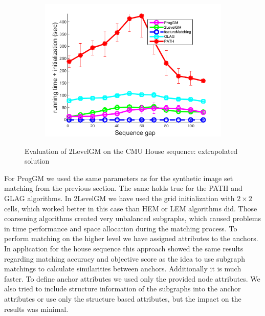 \begin{figure}[h]
\begin{subfigure}[b]{0.32\textwidth}
			\includegraphics[scale=0.25]{"chapter3/fig/HouseSeq2/anchor_descr/using_cpd_afftrafo/ext_solution2/performance/time_summary"}
		\end{subfigure} 	
	\caption[Evaluation of 2LevelGM on the CMU House sequence]{Evaluation of 2LevelGM on the CMU House sequence: extrapolated solution} \label{fig:House_ext_sol}
\end{figure}

For ProgGM we used the same parameters as for the synthetic image set matching from the previous section. The same holds true for the PATH and GLAG algorithms.
In 2LevelGM we have used the grid initialization with $2\times 2$ cells, which worked better in this case than HEM or LEM algorithms did. Those coarsening algorithms created very unbalanced subgraphs, which caused problems in time performance and space allocation during the matching process. To perform matching on the higher level we have assigned attributes to the anchors. In application for the house sequence this approach showed the same results regarding matching accuracy and objective score as the idea to use subgraph matchings to calculate similarities between anchors. Additionally it is much faster. To define anchor attributes we used only the provided node attributes. We also tried to include structure information of the subgraphs into the anchor attributes or use only the structure based attributes, but the impact on the results was minimal.

